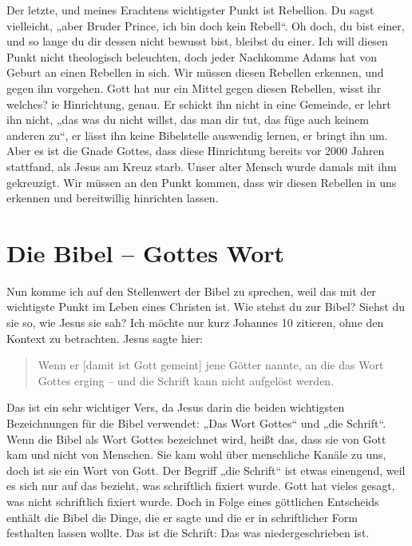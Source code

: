 Der letzte, und meines Erachtens wichtigster Punkt ist Rebellion. Du sagst vielleicht, „aber Bruder Prince, ich bin doch kein Rebell“. 
Oh doch, du bist einer, und so lange du dir dessen nicht bewusst bist, bleibst du einer. 
Ich will diesen Punkt nicht theologisch beleuchten, doch jeder Nachkomme Adams hat von Geburt an einen Rebellen in sich. 
Wir müssen diesen Rebellen erkennen, und gegen ihn vorgehen. 
Gott hat nur ein Mittel gegen diesen Rebellen, wisst ihr welches? 
ie Hinrichtung, genau. 
Er schickt ihn nicht in eine Gemeinde, er lehrt ihn nicht, „das was du nicht willst, das man dir tut, das füge auch keinem anderen zu“, er lässt ihn keine Bibelstelle auswendig lernen, er bringt ihn um. 
Aber es ist die Gnade Gottes, dass diese Hinrichtung bereits vor 2000 Jahren stattfand, als Jesus am Kreuz starb. 
Unser alter Mensch wurde damals mit ihm gekreuzigt. 
Wir müssen an den Punkt kommen, dass wir diesen Rebellen in uns erkennen und bereitwillig hinrichten lassen.

\section{Die Bibel – Gottes Wort}

Nun komme ich auf den Stellenwert der Bibel zu sprechen, weil das mit der wichtigste Punkt im Leben eines Christen ist. 
Wie stehst du zur Bibel? 
Siehst du sie so, wie Jesus sie sah? 
Ich möchte nur kurz Johannes 10 zitieren, ohne den Kontext zu betrachten.
Jesus sagte hier:

\begin{quotation}
  Wenn er [damit ist Gott gemeint] jene Götter nannte, an die das Wort Gottes erging – und die Schrift kann nicht aufgelöst werden.
\end{quotation}

Das ist ein sehr wichtiger Vers, da Jesus darin die beiden wichtigsten Bezeichnungen für die Bibel verwendet: „Das Wort Gottes“ und „die Schrift“. Wenn die Bibel als Wort Gottes bezeichnet wird, heißt das, dass sie von Gott kam und nicht von Menschen.
Sie kam wohl über menschliche Kanäle zu uns, doch ist sie ein Wort von Gott. Der Begriff „die Schrift“ ist etwas einengend, weil es sich nur auf das bezieht, was schriftlich fixiert wurde. 
Gott hat vieles gesagt, was nicht schriftlich fixiert wurde. 
Doch in Folge eines göttlichen Entscheids enthält die Bibel die Dinge, die er sagte und die er in schriftlicher Form festhalten lassen wollte. 
Das ist die Schrift: Das was niedergeschrieben ist.

